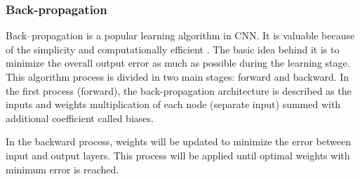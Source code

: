 \subsubsection{Back-propagation}
Back–propagation is a popular learning algorithm in CNN. It is valuable because of the simplicity and computationally efficient \citep{Bengio2012}.
The basic idea behind it is to minimize the overall output error as much as possible during the learning stage. This algorithm process is divided in two main stages: forward and backward. In the first process (forward), the back-propagation architecture is described as  the inputs and weights multiplication of each node (separate input) summed with  additional coefficient called biases.\citep{Hameed2016} 

In the backward process, weights will be updated to minimize the error between input and output layers.
This process will be applied until optimal weights with minimum error is reached.\citep{Hameed2016}


